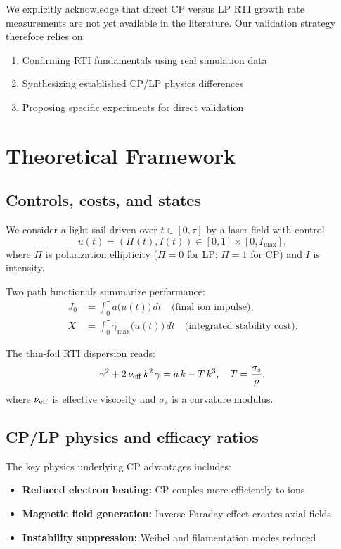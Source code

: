 \documentclass[aps,pre,twocolumn,showpacs,superscriptaddress]{revtex4-2}
\theoremstyle{definition}
\begin{document}
We explicitly acknowledge that direct CP versus LP RTI growth rate measurements are not yet available in the literature. Our validation strategy therefore relies on:
\begin{enumerate}
\item Confirming RTI fundamentals using real simulation data
\item Synthesizing established CP/LP physics differences
\item Proposing specific experiments for direct validation
\end{enumerate}

\section{Theoretical Framework}\label{sec:theory}

\subsection{Controls, costs, and states}

We consider a light-sail driven over $t\in[0,\tau]$ by a laser field with control
\[
u(t)=(\Pi(t),I(t))\in[0,1]\times[0,I_{\max}],
\]
where $\Pi$ is polarization ellipticity ($\Pi=0$ for LP; $\Pi=1$ for CP) and $I$ is intensity. 

Two path functionals summarize performance:
\begin{align}
J_0 &= \int_0^\tau a\big(u(t)\big)\,dt \quad \text{(final ion impulse)},\\
X   &= \int_0^\tau \gamma_{\max}\big(u(t)\big)\,dt \quad \text{(integrated stability cost)}.
\end{align}

The thin-foil RTI dispersion reads:
\begin{equation}
\gamma^2 + 2\,\nu_{\rm eff}\,k^2\,\gamma = a\,k - T\,k^3, \quad T=\frac{\sigma_s}{\rho}, \label{eq:dispersion}
\end{equation}
where $\nu_{\rm eff}$ is effective viscosity and $\sigma_s$ is a curvature modulus.

\subsection{CP/LP physics and efficacy ratios}

The key physics underlying CP advantages includes:
\begin{itemize}
\item \textbf{Reduced electron heating:} CP couples more efficiently to ions~\cite{Robinson2009PPCF}
\item \textbf{Magnetic field generation:} Inverse Faraday effect creates axial fields~\cite{Chen2023}
\item \textbf{Instability suppression:} Weibel and filamentation modes reduced~\cite{Liu2024}
\end{itemize}
\end{document}
